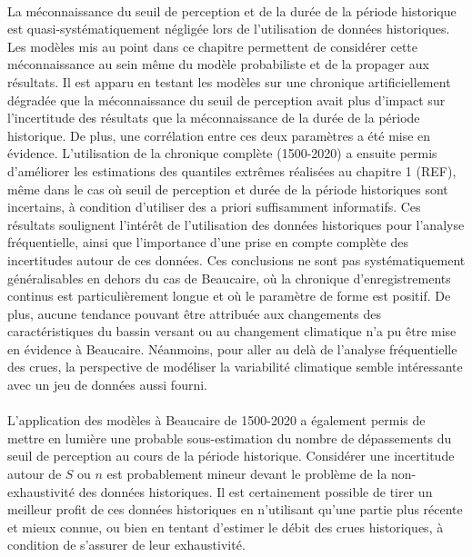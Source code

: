 \documentclass[11pt]{article}
\begin{document}
	\paragraph{} La méconnaissance du seuil de perception et de la durée de la période historique est quasi-systématiquement négligée lors de l'utilisation de données historiques. Les modèles mis au point dans ce chapitre permettent de considérer cette méconnaissance au sein même du modèle probabiliste et de la propager aux résultats. Il est apparu en testant les modèles sur une chronique artificiellement dégradée que la méconnaissance du seuil de perception avait plus d'impact sur l'incertitude des résultats que la méconnaissance de la durée de la période historique. De plus, une corrélation entre ces deux paramètres a été mise en évidence. L'utilisation de la chronique complète (1500-2020) a ensuite permis d'améliorer les estimations des quantiles extrêmes réalisées au chapitre 1 (REF), même dans le cas où seuil de perception et durée de la période historiques sont incertains, à condition d'utiliser des a priori suffisamment informatifs. Ces résultats soulignent l'intérêt de l'utilisation des données historiques pour l'analyse fréquentielle, ainsi que l'importance d'une prise en compte complète des incertitudes autour de ces données. Ces conclusions ne sont pas systématiquement généralisables en dehors du cas de Beaucaire, où la chronique d'enregistrements continus est particulièrement longue et où le paramètre de forme est positif. De plus, aucune tendance pouvant être attribuée aux changements des caractéristiques du bassin versant ou au changement climatique n'a pu être mise en évidence à Beaucaire. Néanmoins, pour aller au delà de l'analyse fréquentielle des crues, la perspective de modéliser la variabilité climatique semble intéressante avec un jeu de données aussi fourni.
	
	\paragraph{} L'application des modèles à Beaucaire de 1500-2020 a également permis de mettre en lumière une probable sous-estimation du nombre de dépassements du seuil de perception au cours de la période historique. Considérer une incertitude autour de $S$ ou $n$ est probablement mineur devant le problème de la non-exhaustivité des données historiques. Il est certainement possible de tirer un meilleur profit de ces données historiques en n'utilisant qu'une partie plus récente et mieux connue, ou bien en tentant d'estimer le débit des crues historiques, à condition de s'assurer de leur exhaustivité. 




\printbibliography[title=Bibliographie]
\end{document}
